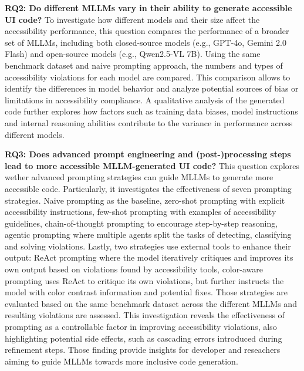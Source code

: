\textbf{RQ2: Do different MLLMs vary in their ability to generate accessible UI code?}
To investigate how different models and their size affect the 
accessibility performance, this question compares the performance of 
a broader set of MLLMs, including both closed-source models
(e.g., GPT-4o, Gemini 2.0 Flash) and open-source
models (e.g., Qwen2.5-VL 7B). Using the same benchmark dataset and 
naive prompting approach, the numbers and types of accessibility 
violations for each model are compared. This comparison allows to
identify the differences in model behavior and analyze potential 
sources of bias or limitations in accessibility compliance. A
qualitative analysis of the generated code further explores how 
factors such as training data biases, model instructions and 
internal reasoning abilities contribute to the variance in
performance across different models.\newline

\textbf{RQ3: Does advanced prompt engineering and (post-)processing steps lead to more accessible MLLM-generated UI
code?}
This question explores wether advanced prompting strategies can guide 
MLLMs to generate more accessible code. Particularly, it investigates
the effectiveness of seven prompting strategies. Naive prompting as the
baseline, zero-shot prompting with explicit accessibility instructions,
few-shot prompting with examples of accessibility guidelines,
chain-of-thought prompting to encourage step-by-step reasoning, 
agentic prompting where multiple agents split the tasks of
detecting, classifying and solving violations. 
Lastly, two strategies use external tools to enhance their output:
ReAct prompting where the model iteratively critiques and improves 
its own output based on violations found by accessibility tools, 
color-aware prompting uses ReAct to critique its own violations, but 
further instructs the model with color contrast information and 
potential fixes. Those strategies are evaluated based on the same 
benchmark dataset across the different MLLMs and resulting violations 
are assessed. This investigation reveals the effectiveness of prompting 
as a controllable factor in improving accessibility violations, 
also highlighting potential side effects, such as cascading 
errors introduced during refinement steps. Those finding provide 
insights for developer and reseachers aiming to guide MLLMs towards 
more inclusive code generation.\newline


